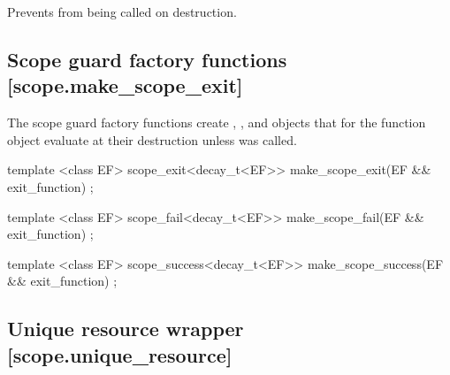\documentclass[ebook,11pt,article]{memoir}
\begin{document}
\begin{itemdescr}
\pnum
Prevents  from being called on destruction.\\
\end{itemdescr}


\subsection {Scope guard factory functions [scope.make_scope_exit]}
\pnum
The scope guard factory functions create , , and  objects that for the function object  evaluate  at their destruction unless  was called.

\begin{itemdecl}
template <class EF>
scope_exit<decay_t<EF>> make_scope_exit(EF && exit_function) ;
\end{itemdecl}

\begin{itemdescr}
\pnum
\returns {}
\end{itemdescr}

\begin{itemdecl}
template <class EF>
scope_fail<decay_t<EF>> make_scope_fail(EF && exit_function) ;
\end{itemdecl}

\begin{itemdescr}
\pnum
\pnum
\returns {}
\end{itemdescr}

\begin{itemdecl}
template <class EF>
scope_success<decay_t<EF>> make_scope_success(EF && exit_function) ;
\end{itemdecl}

\begin{itemdescr}
\pnum
\pnum
\returns {}

\end{itemdescr}


\newpage

\subsection{Unique resource wrapper [scope.unique_resource]}
\end{document}
